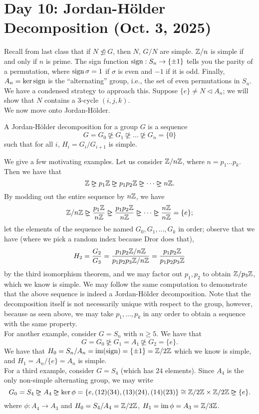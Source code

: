 \section{Day 10: Jordan-H\"older Decomposition (Oct. 3, 2025)}
Recall from last class that if $N \nunlhd G$, then $N$, $G/N$ are simple. $\mathbb Z/n$ is simple if and only if $n$ is prime. The sign function $\operatorname{sign} : S_n \to \{\pm 1\}$ tells you the parity of a permutation, where $\operatorname{sign} \sigma = 1$ if $\sigma$ is even and $-1$ if it is odd. Finally, $A_n = \ker \operatorname{sign}$ is the ``alternating'' group, i.e., the set of even permutations in $S_n$.
\\[8pt]
We have a condensed strategy to approach this. Suppose $\{e\} \neq N \lhd A_n$; we will show that $N$ contains a $3$-cycle $(i, j, k)$.
\\[8pt]
We now move onto Jordan-H\"older.
\begin{definition}
    A Jordan-H\"older decomposition for a group $G$ is a sequence
    \[ G = G_0 \nunrhd G_1 \nunrhd \dots \nunrhd G_n = \{0\} \]
    such that for all $i$, $H_i = G_i/G_{i+1}$ is simple.
\end{definition}
\noindent We give a few motivating examples. Let us consider $\mathbb Z/n\mathbb Z$, where $n = p_1 \dots p_k$. Then we have that
\[ \ZZ \nunrhd p_1 \ZZ \nunrhd p_1 p_2 \ZZ \nunrhd \dots \nunrhd n \ZZ. \]
By modding out the entire sequence by $n\mathbb Z$, we have
\[ \ZZ/n\ZZ \nunrhd \frac{p_1 \ZZ}{n\ZZ} \nunrhd \frac{p_1p_2 \ZZ}{n\ZZ} \nunrhd \dots \nunrhd \frac{n\ZZ}{n\ZZ} = \{e\}; \]
let the elements of the sequence be named $G_0, G_1, \dots, G_k$ in order; observe that we have (where we pick a random index because Dror does that),
\[ H_2 = \frac{G_2}{G_3} = \frac{p_1p_2 \mathbb Z / n\mathbb Z}{p_1p_2p_3 \mathbb Z / n\mathbb Z} = \frac{p_1p_2 \mathbb Z}{p_1p_2p_3 \mathbb Z} \]
by the third isomorphism theorem, and we may factor out $p_1, p_2$ to obtain $\mathbb Z/p_3\mathbb Z$, which we know is simple. We may follow the same computation to demonstrate that the above sequence is indeed a Jordan-H\"older decomposition. Note that the decomposition itself is not necessarily unique with respect to the group, however, because as seen above, we may take $p_1, \dots, p_k$ in any order to obtain a sequence with the same property.
\\[8pt]
For another example, consider $G = S_n$ with $n \geq 5$. We have that
\[ G = G_0 \nunrhd G_1 = A_1 \nunrhd G_2 = \{e\}. \]
We have that $H_0 = S_n/A_n = \operatorname{im}(\operatorname{sign}) = \{\pm 1\} = \mathbb Z/2\mathbb Z$ which we know is simple, and $H_1 = A_n/\{e\} = A_n$ is simple.
\\[8pt]
For a third example, consider $G = S_4$ (which has $24$ elements). Since $A_4$ is the only non-simple alternating group, we may write
\[ G_0 = S_4 \nunrhd A_4 \nunrhd \ker \phi = \{e, (12)(34), (13)(24), (14)(23)\} \cong \ZZ/2\ZZ \times \ZZ/2\ZZ \nunrhd \{e\}. \]
where $\phi : A_4 \to A_3$ and $H_0 = S_4/A_4 = \mathbb Z/2\mathbb Z$, $H_1 = \operatorname{im} \phi = A_3 = \mathbb Z/3\mathbb Z$. %